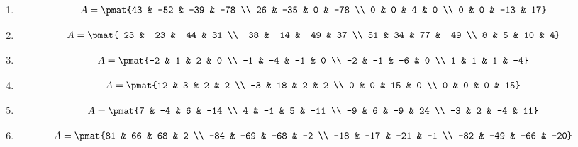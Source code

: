 \begin{enumerate}
\item

\begin{align*}
A = \pmat{43 & -52 & -39 & -78 \\ 26 & -35 & 0 & -78 \\ 0 & 0 & 4 & 0 \\ 0 & 0 & -13 & 17}
\end{align*}

\item

\begin{align*}
A = \pmat{-23 & -23 & -44 & 31 \\ -38 & -14 & -49 & 37 \\ 51 & 34 & 77 & -49 \\ 8 & 5 & 10 & 4}
\end{align*}

\item

\begin{align*}
A = \pmat{-2 & 1 & 2 & 0 \\ -1 & -4 & -1 & 0 \\ -2 & -1 & -6 & 0 \\ 1 & 1 & 1 & -4}
\end{align*}

\item

\begin{align*}
A = \pmat{12 & 3 & 2 & 2 \\ -3 & 18 & 2 & 2 \\ 0 & 0 & 15 & 0 \\ 0 & 0 & 0 & 15}
\end{align*}

\item

\begin{align*}
A = \pmat{7 & -4 & 6 & -14 \\ 4 & -1 & 5 & -11 \\ -9 & 6 & -9 & 24 \\ -3 & 2 & -4 & 11}
\end{align*}

\item

\begin{align*}
A = \pmat{81 & 66 & 68 & 2 \\ -84 & -69 & -68 & -2 \\ -18 & -17 & -21 & -1 \\ -82 & -49 & -66 & -20}
\end{align*}


\end{enumerate}
